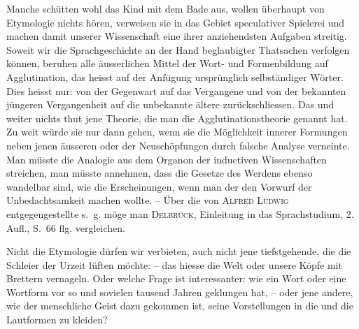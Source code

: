 {\largerpage[1]Manche schütten wohl das Kind mit dem Bade aus, wollen überhaupt von Etymologie nichts hören, verweisen sie in das Gebiet speculativer Spielerei und machen damit unserer Wissenschaft eine ihrer anziehendsten Aufgaben streitig. Soweit wir die Sprachgeschichte an der Hand beglaubigter Thatsachen verfolgen können, beruhen alle äusserlichen Mittel der Wort- und Formenbildung auf Agglutination, das heisst auf der Anfügung ursprünglich selbständiger Wörter. Dies  heisst nur: von der Gegenwart auf das Vergangene und von der bekannten jüngeren Vergangenheit auf die unbekannte ältere zurück\label{fp.190}schliessen. Das und weiter nichts thut jene Theorie, die man die Ag\-glutinationstheorie genannt hat. Zu weit würde sie nur dann gehen, wenn sie die Möglichkeit innerer Formungen neben jenen äusseren oder der Neuschöpfungen durch falsche Analyse verneinte. Man müsste die Analogie aus dem Organon der inductiven Wissenschaften streichen, man müsste annehmen, dass die Gesetze des Werdens ebenso wandelbar sind, wie die Erscheinungen, wenn man der  den Vorwurf der Unbedachtsamkeit machen wollte.  – Über die von \textsc{Alfred Ludwig} entgegengestellte s.~g.  möge man \textsc{Delbrück}, Einleitung in das Sprachstudium, 2. Aufl., S.~66 flg. vergleichen.

Nicht die Etymologie dürfen wir verbieten, auch nicht jene tiefstgehende, die die Schleier der Urzeit lüften möchte: – das hiesse die Welt oder unsere Köpfe mit Brettern vernageln. Oder welche Frage ist interessanter: wie ein Wort oder eine Wortform vor so und sovielen tausend Jahren geklungen hat, – oder jene andere, wie der menschliche Geist dazu gekommen ist, seine Vorstellungen in die und die Lautformen zu kleiden?

}
